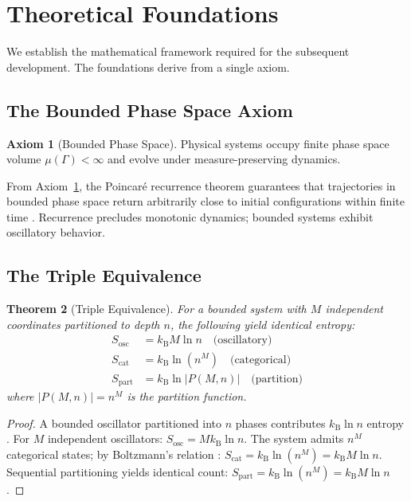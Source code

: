 \documentclass[10pt,twocolumn]{article}
\newtheorem{theorem}{Theorem}[section]
\theoremstyle{definition}
\newtheorem{axiom}[theorem]{Axiom}
\theoremstyle{remark}
\newcommand{\kB}{k_{\mathrm{B}}}
\begin{document}
\section{Theoretical Foundations}
\label{sec:foundations}

We establish the mathematical framework required for the subsequent development. The foundations derive from a single axiom.

\subsection{The Bounded Phase Space Axiom}

\begin{axiom}[Bounded Phase Space]
\label{axiom:bounded}
Physical systems occupy finite phase space volume $\mu(\Gamma) < \infty$ and evolve under measure-preserving dynamics.
\end{axiom}

From Axiom~\ref{axiom:bounded}, the Poincar\'{e} recurrence theorem \cite{poincare1890} guarantees that trajectories in bounded phase space return arbitrarily close to initial configurations within finite time \cite{walters1982,arnold1989}. Recurrence precludes monotonic dynamics; bounded systems exhibit oscillatory behavior.

\subsection{The Triple Equivalence}

\begin{theorem}[Triple Equivalence]
\label{thm:triple}
For a bounded system with $M$ independent coordinates partitioned to depth $n$, the following yield identical entropy:
\begin{align}
S_{\text{osc}} &= \kB M \ln n \quad \text{(oscillatory)} \\
S_{\text{cat}} &= \kB \ln(n^M) \quad \text{(categorical)} \\
S_{\text{part}} &= \kB \ln|P(M,n)| \quad \text{(partition)}
\end{align}
where $|P(M,n)| = n^M$ is the partition function.
\end{theorem}

\begin{proof}
A bounded oscillator partitioned into $n$ phases contributes $\kB \ln n$ entropy \cite{boltzmann1877}. For $M$ independent oscillators: $S_{\text{osc}} = M \kB \ln n$. The system admits $n^M$ categorical states; by Boltzmann's relation \cite{gibbs1902}: $S_{\text{cat}} = \kB \ln(n^M) = \kB M \ln n$. Sequential partitioning yields identical count: $S_{\text{part}} = \kB \ln(n^M) = \kB M \ln n$.
\end{proof}
\end{document}

